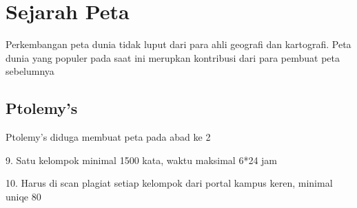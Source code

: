 	\section{Sejarah Peta}
	Perkembangan peta dunia tidak luput dari para ahli geografi dan kartografi. Peta dunia yang populer pada saat ini merupkan kontribusi dari para 
	pembuat peta sebelumnya

	\subsection{Ptolemy's}
	Ptolemy's diduga membuat peta pada abad ke 2
	
9. Satu kelompok minimal 1500 kata, waktu maksimal 6*24 jam

10. Harus di scan plagiat setiap kelompok dari portal kampus keren, minimal uniqe 80%

